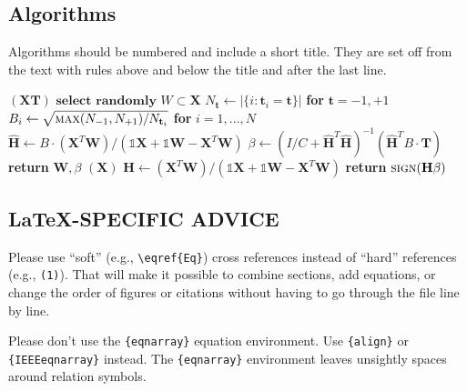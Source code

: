 \documentclass{ieeetj}
\begin{document}
\subsection{Algorithms}
Algorithms should be numbered and include a short title.
They are set off from the text with rules above and below the title and after the last line.
\begin{algorithm}[H]
\caption{Weighted Tanimoto ELM.}\label{alg:alg1}
\begin{algorithmic}
\STATE 
{}$(\mathbf{X} \mathbf{T})$
\STATE \hspace{0.5cm}$ \textbf{select randomly } W \subset \mathbf{X}  $
\STATE \hspace{0.5cm}$ N_\mathbf{t} \gets | \{ i : \mathbf{t}_i = \mathbf{t} \} | $ \textbf{ for } $ \mathbf{t}= -1,+1 $
\STATE \hspace{0.5cm}$ B_i \gets \sqrt{ \textsc{max}(N_{-1},N_{+1}) / N_{\mathbf{t}_i} } $ \textbf{ for } $ i = 1,...,N $
\STATE \hspace{0.5cm}$ \hat{\mathbf{H}} \gets  B \cdot (\mathbf{X}^T\textbf{W})/( \mathbb{1}\mathbf{X} + \mathbb{1}\textbf{W} - \mathbf{X}^T\textbf{W} ) $
\STATE \hspace{0.5cm}$ \beta \gets \left ( I/C + \hat{\mathbf{H}}^T\hat{\mathbf{H}} \right )^{-1}(\hat{\mathbf{H}}^T B\cdot \mathbf{T})  $
\STATE \hspace{0.5cm}\textbf{return} $\textbf{W},  \beta $
\STATE 
{}$(\mathbf{X} )$
\STATE \hspace{0.5cm}$ \mathbf{H} \gets  (\mathbf{X}^T\textbf{W} )/( \mathbb{1}\mathbf{X}  + \mathbb{1}\textbf{W}- \mathbf{X}^T\textbf{W}  ) $
\STATE \hspace{0.5cm}\textbf{return}  $\textsc{sign}( \mathbf{H} \beta )$
\end{algorithmic}
\label{alg1}
\end{algorithm}

\subsection{\LaTeX-SPECIFIC ADVICE}

Please use ``soft'' (e.g., \verb|\eqref{Eq}|) cross references instead
of ``hard'' references (e.g., \verb|(1)|). That will make it possible
to combine sections, add equations, or change the order of figures or
citations without having to go through the file line by line.

Please don't use the \verb|{eqnarray}| equation environment. Use
\verb|{align}| or \verb|{IEEEeqnarray}| instead. The \verb|{eqnarray}|
environment leaves unsightly spaces around relation symbols.
\end{document}
